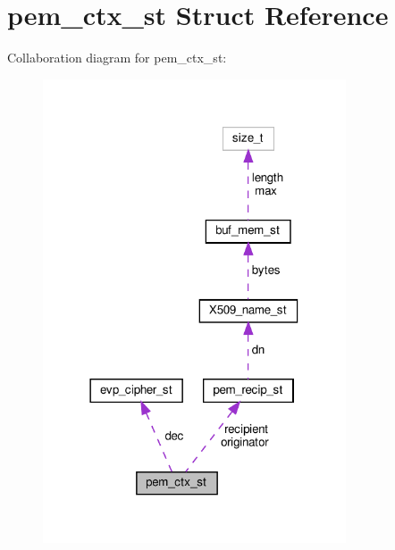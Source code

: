 \hypertarget{structpem__ctx__st}{}\section{pem\+\_\+ctx\+\_\+st Struct Reference}
\label{structpem__ctx__st}


Collaboration diagram for pem\+\_\+ctx\+\_\+st\+:
\nopagebreak
\begin{figure}[H]
\begin{center}
\leavevmode
\includegraphics[width=254pt]{structpem__ctx__st__coll__graph}
\end{center}
\end{figure}
